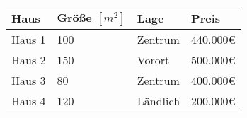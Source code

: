 \begin{tabularx}{\textwidth}{|X|X|X|X|}
    \hline
    \textbf{Haus} & \textbf{Größe $[m^2]$} & \textbf{Lage} & \textbf{Preis} \\
    \hline
    Haus 1        & 100                    & Zentrum       & 440.000€       \\
    \hline
    Haus 2        & 150                    & Vorort        & 500.000€       \\
    \hline
    Haus 3        & 80                     & Zentrum       & 400.000€       \\
    \hline
    Haus 4        & 120                    & Ländlich      & 200.000€       \\
    \hline
\end{tabularx}